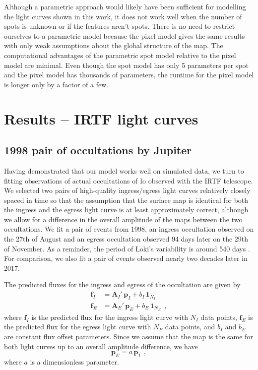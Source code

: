 \documentclass[12pt,dvipsnames]{report}
\newcommand{\hquad}{~~}
\begin{document}
Although a parametric approach would likely have been sufficient for modelling the light curves shown in this work, it does not work well when the number of spots is unknown or if the features aren't spots.
There is no need to restrict ourselves to a parametric model because the pixel model gives the same results with only weak assumptions about the global structure of the map. 
The computational advantages of the parametric spot model relative to the pixel model are minimal. 
Even though the spot model has only 5 parameters per spot and the pixel model has thousands of parameters, the runtime for the pixel model is longer only by a factor of a few. 

\section{Results -- IRTF light curves}
\label{sec:io_results}
\subsection{1998 pair of occultations by Jupiter}
\label{ssec:irtf_1998}
Having demonstrated that our model works well on simulated data, we turn to fitting observations of actual occultations of Io observed with the IRTF telescope.
We selected two pairs of high-quality ingress/egress light curves relatively closely spaced in time so that the assumption that the surface map is identical for both the ingress and the egress light curve is at least approximately correct, although we allow for a difference in the overall amplitude of the maps between the two occultations.
We fit a pair of events from 1998, an ingress occultation observed on the 27th of August and an egress occultation observed  94 days later on the 29th of November.
As a reminder, the period of Loki's variability is around 540 days \citep{rathbun2002}.
For comparison, we also fit a pair of events observed nearly two decades later in 2017.

The predicted fluxes for the ingress and egress of the occultation are given by 
\begin{align}
    \mathbf{f}_I&=\mathbf{A}_I'\,\mathbf{p}_I +b_I\,\mathbf{1}_{N_I}\\
    \mathbf{f}_E&=\mathbf{A}_E'\,\mathbf{p}_E +b_E\,\mathbf{1}_{N_E}
    \hquad,
\end{align}
where $\mathbf{f}_I$ is the predicted flux for the ingress light curve with $N_I$ data points, $\mathbf{f}_E$ is the predicted flux for the egress light curve with $N_E$ data points, and $b_I$ and $b_E$ are constant flux offset parameters.
Since we assume that the map is the same for both light curves up to an overall amplitude difference, we have
\begin{equation}
    \mathbf{p}_E=a\,\mathbf{p}_I
    \hquad,
\end{equation}
where $a$ is a dimensionless parameter.
\end{document}
